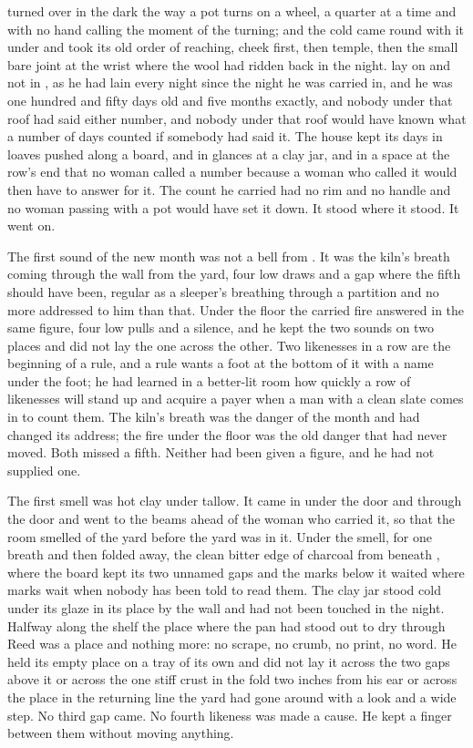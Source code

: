 
 turned over in the dark the way a pot turns on a wheel, a quarter at a time and with no hand calling the moment of the turning; and the cold came round with it under  and took its old order of reaching, cheek first, then temple, then the small bare joint at the wrist where the wool had ridden back in the night.  lay on  and not in , as he had lain every night since the night he was carried in, and he was one hundred and fifty days old and five months exactly, and nobody under that roof had said either number, and nobody under that roof would have known what a number of days counted if somebody had said it. The house kept its days in loaves pushed along a board, and in glances at a clay jar, and in a space at the row's end that no woman called a number because a woman who called it would then have to answer for it. The count he carried had no rim and no handle and no woman passing with a pot would have set it down. It stood where it stood. It went on.

The first sound of the new month was not a bell from . It was the kiln's breath coming through the wall from the yard, four low draws and a gap where the fifth should have been, regular as a sleeper's breathing through a partition and no more addressed to him than that. Under the floor the carried fire answered in the same figure, four low pulls and a silence, and he kept the two sounds on two places and did not lay the one across the other. Two likenesses in a row are the beginning of a rule, and a rule wants a foot at the bottom of it with a name under the foot; he had learned in a better-lit room how quickly a row of likenesses will stand up and acquire a payer when a man with a clean slate comes in to count them. The kiln's breath was the danger of the month and had changed its address; the fire under the floor was the old danger that had never moved. Both missed a fifth. Neither had been given a figure, and he had not supplied one.

The first smell was hot clay under tallow. It came in under the door and through the door and went to the beams ahead of the woman who carried it, so that the room smelled of the yard before the yard was in it. Under the smell, for one breath and then folded away, the clean bitter edge of charcoal from beneath , where the board kept its two unnamed gaps and the marks below it waited where marks wait when nobody has been told to read them. The clay jar stood cold under its glaze in its place by the wall and had not been touched in the night. Halfway along the shelf the place where the pan had stood out to dry through Reed was a place and nothing more: no scrape, no crumb, no print, no word. He held its empty place on a tray of its own and did not lay it across the two gaps above it or across the one stiff crust in the fold two inches from his ear or across the place in the returning line the yard had gone around with a look and a wide step. No third gap came. No fourth likeness was made a cause. He kept a finger between them without moving anything.

